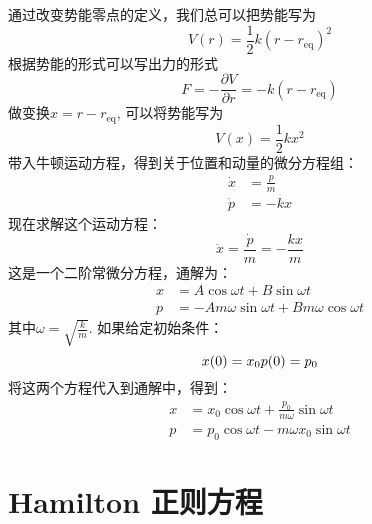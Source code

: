     通过改变势能零点的定义，我们总可以把势能写为
    \begin{equation}
        V(r) = \frac{1}{2}k(r-r_\mathrm{eq})^2
    \end{equation}
    根据势能的形式可以写出力的形式
    \begin{equation}
        F = -\frac {\partial V}{\partial r} = -k(r-r_\mathrm{eq})
    \end{equation}
    做变换$x = r - r_\mathrm{eq}$, 可以将势能写为
    \begin{equation}
        V(x) = \frac 12 kx^2
    \end{equation}
    带入牛顿运动方程，得到关于位置和动量的微分方程组：
    \begin{equation}
        \begin{split}
            \dot{x} &= \frac pm\\
            \dot{p} &= -kx
        \end{split}
    \end{equation}
    现在求解这个运动方程：
    \begin{equation}
        \ddot{x} = \frac {\dot{p}}m = -\frac {kx}{m}
    \end{equation}
    这是一个二阶常微分方程，通解为：
    \begin{equation}
        \begin{split}
            x &= A \cos{\omega t} + B \sin{\omega t}\\
            p &= -{Am\omega} \sin{\omega t} + {Bm \omega} \cos{\omega t}
        \end{split}
    \end{equation}
    其中$\omega = \sqrt{\frac km}$. 如果给定初始条件：
    \begin{equation}
        x(0) = x_0\\
        p(0) = p_0
    \end{equation}
    将这两个方程代入到通解中，得到：
    \begin{equation}
        \begin{split}
            x &= x_0 \cos{\omega t} + \frac {p_0}{m\omega} \sin{\omega t}\\
            p &= p_0 \cos{\omega t} - {m\omega x_0} \sin{\omega t}
        \end{split}
    \end{equation}
    \section{Hamilton 正则方程}
